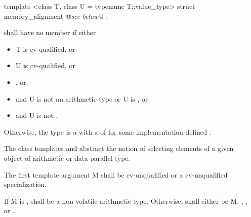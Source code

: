 \begin{itemdecl}
template <class T, class U = typename T::value_type> struct memory_alignment { @\emph{see below}@ };
\end{itemdecl}
\begin{itemdescr}
  \pnum
   shall have no member  if either
  \begin{itemize}
    \item \type T is cv-qualified, or
    \item \type U is cv-qualified, or
    \item {}, or
    \item {} and \type U is not an arithmetic type or \type U is \bool, or
    \item {} and \type U is not \bool.
  \end{itemize}

  \pnum
  Otherwise, the type  is a \BinaryTypeTrait with a \BaseCharacteristic of  for some implementation-defined .
\end{itemdescr}



\pnum The class templates  and  abstract the notion of selecting elements of a given object of arithmetic or data-parallel type.

\pnum The first template argument \type M shall be cv-unqualified \bool or a cv-unqualified \mask specialization.

\pnum
If \type M is \bool,  shall be a non-volatile arithmetic type.
Otherwise,  shall either be \type M, , , or .


